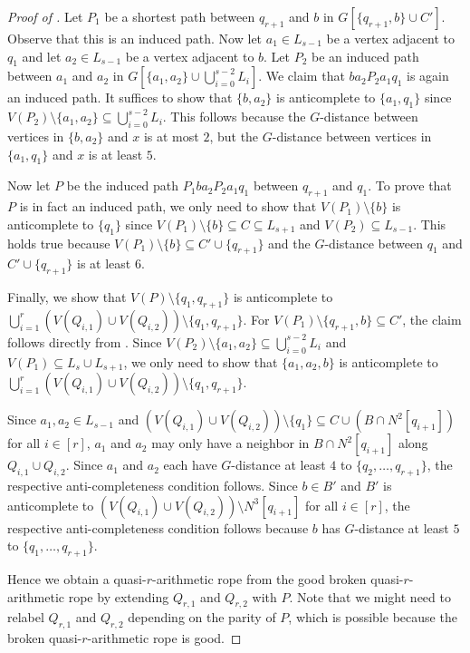 \documentclass{article}
\begin{document}
\begin{proof}[Proof of ]
Let $P_1$ be a shortest path between $q_{r + 1}$ and $b$ in $G[\{q_{r + 1}, b \} \cup C']$. Observe that this is an induced path.
Now let $a_1 \in L_{s-1}$ be a vertex adjacent to $q_1$ and let $a_2 \in L_{s - 1}$ be a vertex adjacent to $b$.
Let $P_2$ be an induced path between $a_1$ and $a_2$ in $G\left[ \{a_1, a_2\} \cup \bigcup_{i = 0}^{s - 2} L_i \right]$. We claim that $ba_2P_2a_1q_1$ is again an induced path. It suffices to show that $\{b , a_2\}$ is anticomplete to $\{a_1, q_1\}$ since $V(P_2) \setminus \{a_1, a_2\} \subseteq \bigcup_{i = 0}^{s - 2} L_i$. This follows because the $G$-distance between vertices in $\{b, a_2\}$ and $x$ is at most $2$, but the $G$-distance between vertices in $\{a_1, q_1\}$ and $x$ is at least $5$.

Now let $P$ be the induced path $P_1ba_2P_2a_1q_1$ between $q_{r + 1}$ and $q_1$. To prove that $P$ is in fact an induced path, we only need to show that $V(P_1) \setminus \{b\}$ is anticomplete to $\{q_1\}$ since $V(P_1) \setminus \{b\} \subseteq C \subseteq L_{s + 1}$ and $V(P_2) \subseteq L_{s - 1}$. This holds true because $V(P_1) \setminus \{b\} \subseteq C' \cup \{q_{r + 1}\}$ and the $G$-distance between $q_1$ and $C' \cup \{q_{r + 1}\}$ is at least 6.

Finally, we show that $V(P) \setminus \{q_1, q_{r + 1}\}$ is anticomplete to $\bigcup_{i = 1}^r (V(Q_{i, 1}) \cup V(Q_{i, 2})) \setminus \{q_1, q_{r + 1}\}$. For $V(P_1) \setminus \{q_{r + 1}, b\} \subseteq C'$, the claim follows directly from . Since $V(P_2) \setminus \{a_1, a_2\} \subseteq \bigcup_{i = 0}^{s - 2} L_i$ and $V(P_1) \subseteq L_s \cup L_{s + 1}$, we only need to show that $\{a_1, a_2, b\}$ is anticomplete to $\bigcup_{i = 1}^r (V(Q_{i, 1}) \cup V(Q_{i, 2})) \setminus \{q_1, q_{r + 1}\}$. 

Since $a_1, a_2 \in L_{s - 1}$ and $(V(Q_{i, 1}) \cup V(Q_{i, 2})) \setminus\{q_1\} \subseteq C \cup (B \cap N^2[q_{i + 1}])$ for all $i \in [r]$, $a_1$ and $a_2$ may only have a neighbor in $B \cap N^2[q_{i + 1}]$ along $Q_{i, 1} \cup Q_{i, 2}$. Since $a_1$ and $a_2$ each have $G$-distance at least $4$ to $\{q_2, \dots, q_{r + 1}\}$, the respective anti-completeness condition follows.
Since $b \in B'$ and $B'$ is anticomplete to $(V(Q_{i, 1}) \cup V(Q_{i, 2})) \setminus N^3[q_{i + 1}]$ for all $i \in [r]$, the respective anti-completeness condition follows because $b$ has $G$-distance at least $5$ to $\{q_1, \dots, q_{r + 1}\}$.

Hence we obtain a quasi-$r$-arithmetic rope from the good broken quasi-$r$-arithmetic rope by extending $Q_{r, 1}$ and $Q_{r,2}$ with $P$. Note that we might need to relabel $Q_{r, 1}$ and $Q_{r, 2}$ depending on the parity of $P$, which is possible because the broken quasi-$r$-arithmetic rope is good.
\end{proof}
\end{document}
